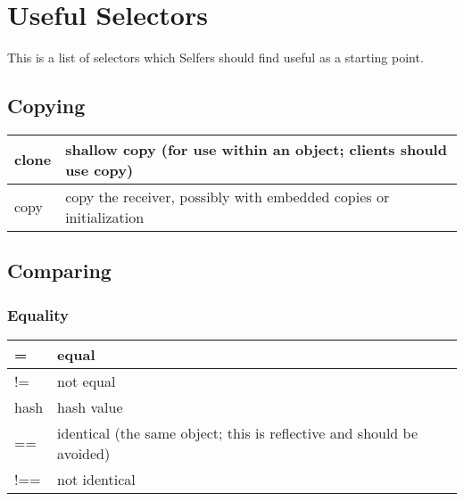 \documentclass[letterpaper,10pt,english]{sphinxmanual}
\begin{document}
\section{Useful Selectors}
\label{\detokenize{usefulselectors:useful-selectors}}\label{\detokenize{usefulselectors::doc}}
This is a list of selectors which Selfers should find useful as a starting point.


\subsection{Copying}
\label{\detokenize{usefulselectors:copying}}
\noindent\begin{tabulary}{\linewidth}{p{5cm} p{10cm}}
\hline

clone
&
shallow copy (for use within an object; clients should use copy)
\\
\hline
copy
&
copy the receiver, possibly with embedded copies or initialization
\\
\hline\end{tabulary}



\subsection{Comparing}
\label{\detokenize{usefulselectors:comparing}}

\subsubsection{Equality}
\label{\detokenize{usefulselectors:equality}}
\noindent\begin{tabulary}{\linewidth}{p{5cm} p{10cm}}
\hline

=
&
equal
\\
\hline
!=
&
not equal
\\
\hline
hash
&
hash value
\\
\hline
==
&
identical (the same object; this is reflective and should be avoided)
\\
\hline
!==
&
not identical
\\
\hline\end{tabulary}
\end{document}
